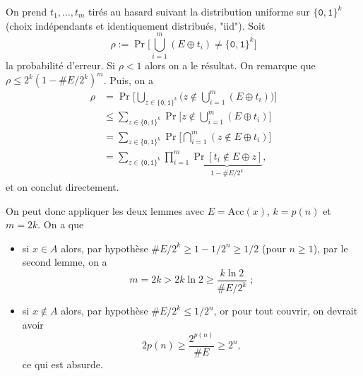 \documentclass[./main]{subfiles}
\begin{document}
\begin{prv}
    \begin{prv}
      On prend $t_1, \ldots, t_m$ tirés au hasard suivant la distribution uniforme sur $\{\texttt{0},\texttt{1}\}^k$ (choix indépendants et identiquement distribués, "iid").
      Soit \[
        \rho := \Pr\Big[ \bigcup_{i=1}^m (E \oplus t_i) \neq \{\texttt{0},\texttt{1}\}^k \Big]
      \]
      la probabilité d'erreur.
      Si $\rho < 1$ alors on a le résultat.
      On remarque que $\rho \le 2^k (1 - \# E / 2^k)^m$. Puis, on a
      \begin{align*}
        \rho
        &= \Pr\Big[\bigcup_{z \in \{\texttt{0},\texttt{1}\}^k}  \Big(z \not\in \bigcup_{i=1}^m (E \oplus t_i)\Big)\Big]\\
        &\le \sum_{z \in \{\texttt{0}, \texttt{1}\}^k} \Pr\Big[z \not\in \bigcup_{i=1}^m (E \oplus t_i)\Big]\\
        &= \sum_{z \in \{\texttt{0}, \texttt{1}\}^k} \Pr\Big[\bigcap_{i=1}^m (z \not\in E \oplus t_i)\Big]\\
        &= \sum_{z \in \{\texttt{0}, \texttt{1}\}^k} \prod_{i=1}^m \underbrace{\Pr[t_i \not\in E \oplus z]}_{1 - \#E / 2^k}
      ,\end{align*}
      et on conclut directement.
    \end{prv}

    On peut donc appliquer les deux lemmes avec $E = \mathrm{Acc}(x)$, $k = p(n)$ et $m = 2 k$.
    On a que 
     \begin{itemize}
      \item si $x \in A$ alors, par hypothèse $\# E / 2^k \ge 1 - 1 / 2^n \ge 1 / 2$ (pour $n \ge 1$),  par le second lemme, on a 
        \[
          m = 2 k > 2 k \ln 2 \ge \frac{k \ln 2}{\# E / 2^k}
        \;;\]
      \item si $x \not\in A$ alors, par hypothèse $\# E / 2^k  \le 1 / 2^n$, or pour tout couvrir, on devrait avoir
        \[
          2 p(n) \ge \frac{2^{p(n)}}{\#E} \ge 2^n
        ,\] 
        ce qui est absurde.
    \end{itemize}
  \end{prv}
\end{document}
